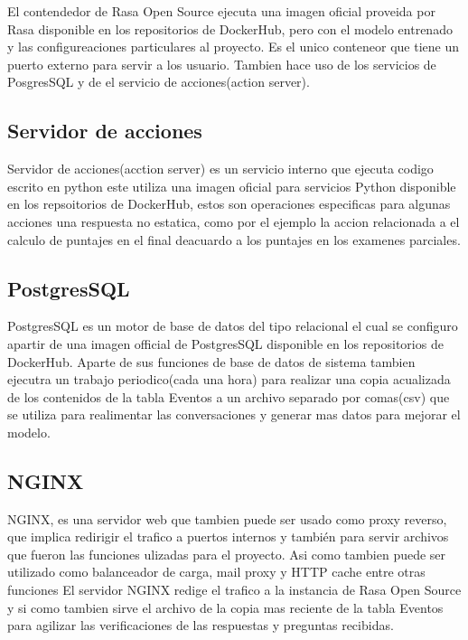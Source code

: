 El contendedor de Rasa Open Source ejecuta una imagen oficial proveida por Rasa disponible en los repositorios de DockerHub\cite{DockerHub}, pero con el modelo entrenado y las configureaciones particulares al proyecto. Es el unico conteneor que tiene un puerto externo para servir a los usuario. Tambien hace uso de los servicios de PosgresSQL y de el servicio de acciones(action server). 


\subsection{Servidor de acciones}

Servidor de acciones(acction server) es un servicio interno que ejecuta codigo escrito en python este utiliza una imagen oficial para servicios Python disponible en los repsoitorios de DockerHub\cite{DockerHub}, estos son operaciones especificas para algunas acciones una respuesta no estatica, como por el ejemplo la accion relacionada a el calculo de puntajes en el final deacuardo a los puntajes en los examenes parciales.

 \subsection{PostgresSQL}
  
 PostgresSQL es un motor de base de datos del tipo relacional\cite{postgresql} el cual se configuro apartir de una imagen official de PostgresSQL disponible en los repositorios de DockerHub\cite{DockerHub}. Aparte de sus funciones de base de datos de sistema tambien ejecutra un trabajo periodico(cada una hora) para realizar una copia acualizada de los contenidos de la tabla Eventos a un archivo separado por comas(csv) que se utiliza para realimentar las conversaciones y generar mas datos para mejorar el modelo. 

 \subsection{NGINX}

 NGINX, es una servidor web que tambien puede ser usado como proxy reverso, que implica redirigir el trafico a puertos internos y también para servir archivos que fueron las funciones ulizadas para el proyecto. Asi como tambien puede ser utilizado como balanceador de carga, mail proxy y HTTP cache entre otras funciones \cite{NGINX}
El servidor NGINX redige el trafico a la instancia de Rasa Open Source y si como tambien sirve el archivo de 
la copia mas reciente de la tabla Eventos para agilizar las verificaciones de las respuestas y preguntas recibidas.

